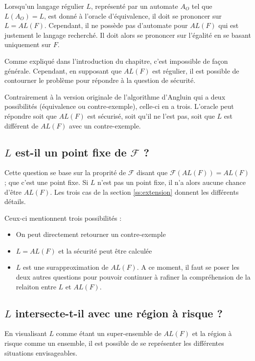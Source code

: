 Lorsqu'un langage régulier $L$, représenté par un automate $A_O$ tel que $L(A_O)=L$, est donné à l'oracle d'équivalence, il doit se prononcer sur $L=AL(F)$. Cependant, il ne possède pas d'automate pour $AL(F)$ qui est justement le langage recherché. Il doit alors se prononcer sur l'égalité en se basant uniquement sur $F$.

Comme expliqué dans l'introduction du chapitre, c'est impossible de façon générale. Cependant, en supposant que $AL(F)$ est régulier, il est possible de contourner le problème pour répondre à la question de sécurité.

Contrairement à la version originale de l'algorithme d'Angluin qui a deux possibilités (équivalence ou contre-exemple), celle-ci en a trois. L'oracle peut répondre soit que $AL(F)$ est sécurisé, soit qu'il ne l'est pas, soit que $L$ est différent de $AL(F)$ avec un contre-exemple.


\subsection*{$L$ est-il un point fixe de $\mathcal{F}$ ?}

Cette question se base sur la proprité de $\mathcal{F}$ disant que $\mathcal{F}(AL(F))=AL(F)$ ; que c'est une point fixe. Si $L$ n'est pas un point fixe, il n'a alors aucune chance d'être $AL(F)$. Les trois cas de la section \ref{ss:extension} donnent les différents détails.

Ceux-ci mentionnent trois possibilités :
\begin{itemize}
  \item On peut directement retourner un contre-exemple
  \item $L=AL(F)$ et la sécurité peut être calculée
  \item $L$ est une surapproximation de $AL(F)$. A ce moment, il faut se poser les deux autres questions pour pouvoir continuer à rafiner la compréhension de la relaiton entre $L$ et $AL(F)$.
\end{itemize}

\subsection*{$L$ intersecte-t-il avec une région à risque ?}

En visualisant $L$ comme étant un super-ensemble de $AL(F)$ et la région à risque comme un ensemble, il est possible de se représenter les différentes situations envisageables.

